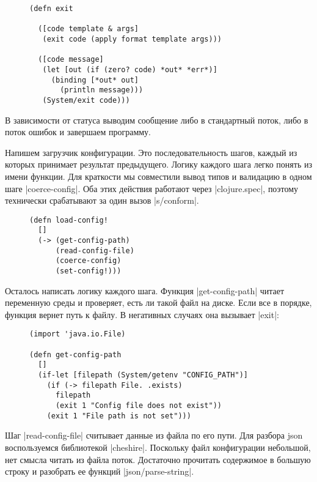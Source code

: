\begin{figure}[!ht]
\begin{verbatim}
(defn exit

  ([code template & args]
   (exit code (apply format template args)))

  ([code message]
   (let [out (if (zero? code) *out* *err*)]
     (binding [*out* out]
       (println message)))
   (System/exit code)))
\end{verbatim}
\end{figure}

В зависимости от статуса выводим сообщение либо в стандартный поток, либо в
поток ошибок и завершаем программу.

Напишем загрузчик конфигурации. Это последовательность шагов, каждый из которых
принимает результат предыдущего. Логику каждого шага легко понять из имени
функции. Для краткости мы совместили вывод типов и валидацию в одном шаге
\spverb|coerce-config|. Оба этих действия работают через \spverb|clojure.spec|, поэтому
технически срабатывают за один вызов \spverb|s/conform|.

\begin{figure}[!ht]
\begin{verbatim}
(defn load-config!
  []
  (-> (get-config-path)
      (read-config-file)
      (coerce-config)
      (set-config!)))
\end{verbatim}
\end{figure}

Осталось написать логику каждого шага. Функция \spverb|get-config-path| читает
переменную среды и проверяет, есть ли такой файл на диске. Если все в порядке,
функция вернет путь к файлу. В негативных случаях она вызывает \spverb|exit|:

\begin{figure}[!ht]
\begin{verbatim}
(import 'java.io.File)

(defn get-config-path
  []
  (if-let [filepath (System/getenv "CONFIG_PATH")]
    (if (-> filepath File. .exists)
      filepath
      (exit 1 "Config file does not exist"))
    (exit 1 "File path is not set")))
\end{verbatim}
\end{figure}

Шаг \spverb|read-config-file| считывает данные из файла по его пути. Для разбора json
воспользуемся библиотекой \spverb|cheshire|. Поскольку файл конфигурации небольшой, нет
смысла читать из файла поток. Достаточно прочитать содержимое в большую строку и
разобрать ее функций \spverb|json/parse-string|.


